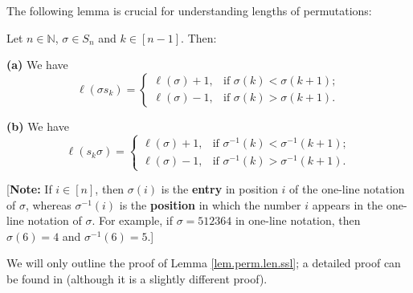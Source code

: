 The following lemma is crucial for understanding lengths of permutations:

\begin{lemma}
\label{lem.perm.len.ssl}Let $n\in\mathbb{N}$, $\sigma\in
S_{n}$ and $k\in\left[  n-1\right]  $. Then: \medskip

\textbf{(a)} We have%
\[
\ell\left(  \sigma s_{k}\right)  =%
\begin{cases}
\ell\left(  \sigma\right)  +1, & \text{if }\sigma\left(  k\right)
<\sigma\left(  k+1\right)  ;\\
\ell\left(  \sigma\right)  -1, & \text{if }\sigma\left(  k\right)
>\sigma\left(  k+1\right)  .
\end{cases}
\]


\textbf{(b)} We have%
\[
\ell\left(  s_{k}\sigma\right)  =%
\begin{cases}
\ell\left(  \sigma\right)  +1, & \text{if }\sigma^{-1}\left(  k\right)
<\sigma^{-1}\left(  k+1\right)  ;\\
\ell\left(  \sigma\right)  -1, & \text{if }\sigma^{-1}\left(  k\right)
>\sigma^{-1}\left(  k+1\right)  .
\end{cases}
\]


[\textbf{Note:} If $i\in\left[  n\right]  $, then $\sigma\left(  i\right)  $
is the \textbf{entry} in position $i$ of the one-line notation of $\sigma$,
whereas $\sigma^{-1}\left(  i\right)  $ is the \textbf{position} in which the
number $i$ appears in the one-line notation of $\sigma$. For example, if
$\sigma=512364$ in one-line notation, then $\sigma\left(  6\right)  =4$ and
$\sigma^{-1}\left(  6\right)  =5$.]
\end{lemma}

We will only outline the proof of Lemma \ref{lem.perm.len.ssl}; a detailed
proof can be found in \cite[Exercise 5.2 \textbf{(a)}]{detnotes} (although it
is a slightly different proof).

